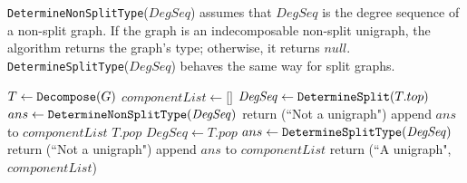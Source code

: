 \documentclass[11pt]{article}
\begin{document}

{\tt DetermineNonSplitType}($\mathit{DegSeq}$) assumes that $\mathit{DegSeq}$ is the degree sequence of a  non-split graph.  If the graph is an  indecomposable non-split unigraph, the algorithm returns the graph's type; otherwise, it returns $null$.   {\tt DetermineSplitType}($\mathit{DegSeq}$) behaves the same way  for split graphs.  


\bigskip
\begin{algorithm}[H]
\caption{{\tt IsUnigraph}($G$)}

\begin{algorithmic}[1]
\STATE $T \leftarrow \text{{\tt Decompose}}(G)$
\STATE $componentList \leftarrow \text{[]}$
 \STATE $\mathit{DegSeq} \leftarrow \text{{\tt DetermineSplit}}(T.{top})$
      \STATE $ans \leftarrow \text{\tt DetermineNonSplitType}(\mathit{DegSeq})$
            \STATE return (``Not a unigraph")
 	\ELSE
 	     \STATE append $ans$ to $\mathit{componentList}$
	     \STATE $T.{pop}$
	 \ENDIF
\ENDIF
{}
    \STATE $\mathit{DegSeq} \leftarrow T.{pop}$
    \STATE $ans \leftarrow \text{\tt DetermineSplitType}(\mathit{DegSeq})$
       \STATE return (``Not a unigraph")
     \ELSE   
         \STATE append $ans$ to $\mathit{componentList}$
      \ENDIF
 \ENDWHILE
 \STATE return (``A unigraph", $\mathit{componentList}$)
  
\end{algorithmic}

\end{algorithm}


 
 
\end{document}
